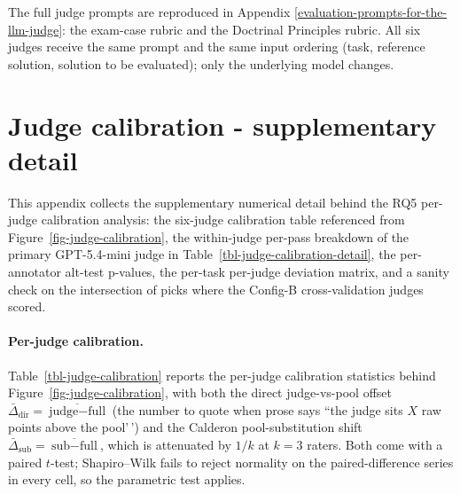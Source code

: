 \documentclass[11pt]{article}
\begin{document}


The full judge prompts are reproduced in Appendix
\ref{evaluation-prompts-for-the-llm-judge}: the exam-case rubric and the
Doctrinal Principles rubric. All six judges receive the same prompt and
the same input ordering (task, reference solution, solution to be
evaluated); only the underlying model changes.

\section{Judge calibration - supplementary
detail}\label{sec-judge-calibration-supplementary-detail}

This appendix collects the supplementary numerical detail behind the RQ5
per-judge calibration analysis: the six-judge calibration table
referenced from Figure~\ref{fig-judge-calibration}, the within-judge
per-pass breakdown of the primary GPT-5.4-mini judge in
Table~\ref{tbl-judge-calibration-detail}, the per-annotator alt-test
p-values, the per-task per-judge deviation matrix, and a sanity check on
the intersection of picks where the Config-B cross-validation judges
scored.

\paragraph{Per-judge calibration.} Table~\ref{tbl-judge-calibration}
reports the per-judge calibration statistics behind
Figure~\ref{fig-judge-calibration}, with both the direct judge-vs-pool
offset \(\bar{\Delta}_{\text{dir}}=\overline{\text{judge}-\text{full}}\)
(the number to quote when prose says ``the judge sits \(X\) raw points
above the pool'\,') and the Calderon pool-substitution shift
\(\bar{\Delta}_{\text{sub}}=\overline{\text{sub}-\text{full}}\), which
is attenuated by \(1/k\) at \(k=3\) raters. Both come with a paired
\(t\)-test; Shapiro--Wilk fails to reject normality on the
paired-difference series in every cell, so the parametric test applies.


\end{document}
